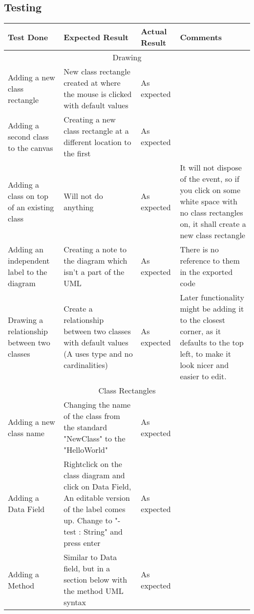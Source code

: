 
\begin{landscape}
\section{Testing}
\begin{tabular}{| p{3cm} | p{7cm} | p{7cm} | p{8cm} | }
	\hline
	Test Done & Expected Result & Actual Result & Comments \\ \hline
	\multicolumn{4}{|c|}{Drawing} \\ \hline

	Adding a new class rectangle & New class rectangle created at where the mouse is clicked with default values& As expected & \\ \hline

	Adding a second class to the canvas & Creating a new class rectangle at a different location to the first & As expected & \\ \hline

	Adding a class on top of an existing class & Will not do anything & As expected & It will not dispose of the event, so if you click on some white space with no class rectangles on, it shall create a new class rectangle\\ \hline
		
	 Adding an independent label to the diagram & Creating a note to the diagram which isn't a part of the UML & As expected & There is no reference to them in the exported code \\ \hline

	 Drawing a relationship between two classes & Create a relationship between two classes with default values (A uses type and no cardinalities)& As expected & Later functionality might be adding it to the closest corner, as it defaults to the top left, to make it look nicer and easier to edit. \\ \hline

	 \multicolumn{4}{|c|}{Class Rectangles} \\ \hline
	
	  Adding a new class name & Changing the name of the class from the standard "NewClass" to the "HelloWorld" & As expected & \\ \hline

	 Adding a Data Field & Rightclick on the class diagram and click on Data Field, An editable version of the label comes up. Change to "- test : String" and press enter & As expected & \\ \hline
	
	 Adding a Method & Similar to Data field, but in a section below with the method UML syntax & As expected & \\ \hline


\end{tabular}
\end{landscape}
